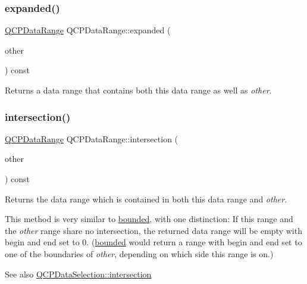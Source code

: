 \subsubsection{\texorpdfstring{expanded()}{expanded()}}
{\footnotesize\ttfamily \mbox{\hyperlink{class_q_c_p_data_range}{Q\+C\+P\+Data\+Range}} Q\+C\+P\+Data\+Range\+::expanded (\begin{DoxyParamCaption}\item[{const \mbox{\hyperlink{class_q_c_p_data_range}{Q\+C\+P\+Data\+Range}} \&}]{other }\end{DoxyParamCaption}) const}

Returns a data range that contains both this data range as well as {\itshape other}. \mbox{\label{class_q_c_p_data_range_a84e1e03129dd52528efb4bac18d30183}} 
\subsubsection{\texorpdfstring{intersection()}{intersection()}}
{\footnotesize\ttfamily \mbox{\hyperlink{class_q_c_p_data_range}{Q\+C\+P\+Data\+Range}} Q\+C\+P\+Data\+Range\+::intersection (\begin{DoxyParamCaption}\item[{const \mbox{\hyperlink{class_q_c_p_data_range}{Q\+C\+P\+Data\+Range}} \&}]{other }\end{DoxyParamCaption}) const}

Returns the data range which is contained in both this data range and {\itshape other}.

This method is very similar to \mbox{\hyperlink{class_q_c_p_data_range_a93529421d12fdd3a8bdb2b8061936352}{bounded}}, with one distinction\+: If this range and the {\itshape other} range share no intersection, the returned data range will be empty with begin and end set to 0. (\mbox{\hyperlink{class_q_c_p_data_range_a93529421d12fdd3a8bdb2b8061936352}{bounded}} would return a range with begin and end set to one of the boundaries of {\itshape other}, depending on which side this range is on.)

\begin{DoxySeeAlso}{See also}
\mbox{\hyperlink{class_q_c_p_data_selection_af5267ced53687561367105ee77b874ab}{Q\+C\+P\+Data\+Selection\+::intersection}} 
\end{DoxySeeAlso}
\mbox{\label{class_q_c_p_data_range_a8a1c437f9beffd55621f48f961d7f679}} 
